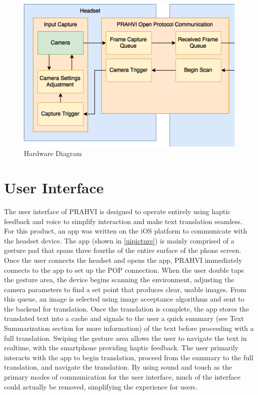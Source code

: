 \begin{figure}
	\centering
	\includegraphics[scale = 0.6]{PRAHVI-HEADSET}
	\caption{Hardware Diagram}
	\label{headsetDiagram}
\end{figure}

\section{User Interface}
The user interface of PRAHVI is designed to operate entirely using haptic feedback and voice to simplify interaction and make text translation seamless. For this product, an app was written on the iOS platform to communicate with the headset device. The app (shown in \ref{uipicture}) is mainly comprised of a gesture pad that spans three fourths of the entire surface of the phone screen. Once the user connects the headset and opens the app, PRAHVI immediately connects to the app to set up the POP connection. When the user double taps the gesture area, the device begins scanning the environment, adjusting the camera parameters to find a set point that produces clear, usable images. From this queue, an image is selected using image acceptance algorithms and sent to the backend for translation. Once the translation is complete, the app stores the translated text into a cache and signals to the user a quick summary (see Text Summarization section for more information) of the text before proceeding with a full translation. Swiping the gesture area allows the user to navigate the text in realtime, with the smartphone providing haptic feedback. The user primarily interacts with the app to begin translation, proceed from the summary to the full translation, and navigate the translation. By using sound and touch as the primary modes of communication for the user interface, much of the interface could actually be removed, simplifying the experience for users.

